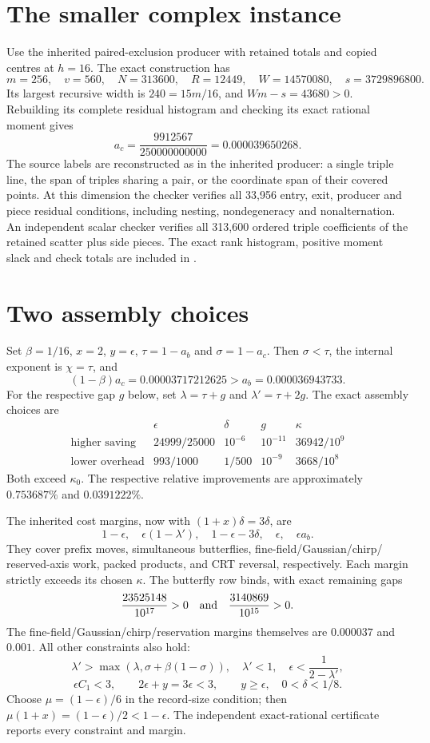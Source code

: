 \section{The smaller complex instance}
Use the inherited paired-exclusion producer with retained totals and copied
centres at $h=16$. The exact construction has
\[
 m=256,\quad v=560,\quad N=313600,\quad R=12449,\quad
 W=14570080,\quad s=3729896800.
\]
Its largest recursive width is $240=15m/16$, and
$Wm-s=43680>0$. Rebuilding its complete residual histogram and checking
its exact rational moment gives
\[
 a_c=\frac{9912567}{250000000000}=0.000039650268.
\]
The source labels are reconstructed as in the inherited producer: a single
triple line, the span of triples sharing a pair, or the coordinate span of
their covered points. At this dimension the checker verifies all 33,956
entry, exit, producer and piece residual conditions, including nesting,
nondegeneracy and nonalternation. An independent scalar checker verifies all
313,600 ordered triple coefficients of the retained scatter plus side pieces.
The exact rank histogram, positive moment slack and check totals are included
in .

\section{Two assembly choices}
Set $\beta=1/16$, $x=2$, $y=\epsilon$, $\tau=1-a_b$ and $\sigma=1-a_c$.
Then $\sigma<\tau$, the internal exponent is $\chi=\tau$, and
\[
 (1-\beta)a_c=0.00003717212625>a_b=0.000036943733.
\]
For the respective gap $g$ below, set
$\lambda=\tau+g$ and $\lambda'=\tau+2g$.
The exact assembly choices are
\[
\begin{array}{c|c|c|c|c}
 &\epsilon&\delta&g&\kappa\\\hline
 \text{higher saving}&24999/25000&10^{-6}&10^{-11}&36942/10^9\\
 \text{lower overhead}&993/1000&1/500&10^{-9}&3668/10^8
\end{array}
\]
Both exceed $\kappa_0$. The respective relative improvements are approximately
$0.753687\%$ and $0.0391222\%$.

The inherited cost margins, now with $(1+x)\delta=3\delta$, are
\[
 1-\epsilon,\quad \epsilon(1-\lambda'),\quad
 1-\epsilon-3\delta,\quad\epsilon,\quad\epsilon a_b.
\]
They cover prefix moves, simultaneous butterflies, fine-field/Gaussian/chirp/
reserved-axis work, packed products, and CRT reversal, respectively.
Each margin strictly exceeds its chosen $\kappa$. The butterfly row binds,
with exact remaining gaps
\[
 \frac{23525148}{10^{17}}>0
 \quad\hbox{and}\quad
 \frac{3140869}{10^{15}}>0.
\]
The fine-field/Gaussian/chirp/reservation margins themselves are $0.000037$
and $0.001$. All other constraints also hold:
\[
 \lambda'>\max(\lambda,\sigma+\beta(1-\sigma)),\quad\lambda'<1,
 \quad\epsilon<\frac1{2-\lambda'},
\]
\[
 \epsilon C_1<3,\qquad 2\epsilon+y=3\epsilon<3,
 \qquad y\ge\epsilon,\quad0<\delta<1/8.
\]
Choose $\mu=(1-\epsilon)/6$ in the record-size condition; then
$\mu(1+x)=(1-\epsilon)/2<1-\epsilon$.
The independent exact-rational certificate reports every constraint and margin.

